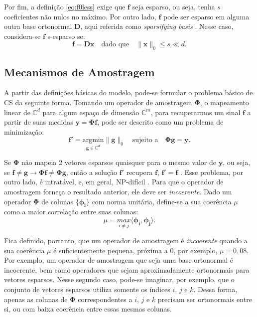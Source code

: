 \documentclass[cic,tc]{iiufrgs}
\renewcommand{\vec}[1]{\bm{#1}}
\newcommand{\mat}[1]{\bm{#1}}
\begin{document}
Por fim, a definição \eqref{eq:f0less} exige que $\vec{f}$ seja esparso, ou seja, tenha $s$ coeficientes não nulos
no máximo. 
Por outro lado, $\vec{f}$ pode ser esparso em alguma outra base ortonormal $\mathbf{D}$, aqui referida como 
\textit{sparsifying basis} \cite{CandesDecoLinear}. Nesse caso, considera-se $\vec{f}$ s-esparso se:
\begin{equation}
    \vec{f} = \mathbf{D}\vec{x} \hspace{1em} \text{dado que} \hspace{1em} \lVert \vec{x} \rVert_0 \le s \ll d.
\end{equation}


\subsection{Mecanismos de Amostragem}
A partir das definições básicas do modelo, pode-se formular o problema básico de CS da seguinte forma.
Tomando um operador de amostragem $\mathbf{\Phi}$, o mapeamento linear de $\mathbb{C}^d$ para algum espaço de dimensão 
$\mathbb{C}^m$, para recuperarmos um sinal $\vec{f}$ a partir de suas medidas $\vec{y} = \mathbf{\Phi} \vec{f}$,
pode ser descrito como um problema de minimização:
\begin{equation}
    \label{eq:problem}
    \vec{f}' = \underset{\vec{g} \in \mathbb{C}^d}{\text{argmin}} \lVert \vec{g} \rVert_0 \hspace{1em} \text{sujeito a} \hspace{1em}
    \mathbf{\Phi} \vec{g} = \vec{y}.
\end{equation}

Se $\mathbf{\Phi}$ não mapeia 2 vetores esparsos quaisquer para o mesmo valor de $\vec{y}$, ou seja,
se $\vec{f} \ne \vec{g} \rightarrow \mathbf{\Phi}\vec{f} \ne \mathbf{\Phi}\vec{g} $, então a solução $\vec{f}'$ recupera
$\vec{f}$, $\vec{f}' = \vec{f}$ \cite{chen2015compressed}. Esse problema, por outro lado, é intratável, e, em geral,
NP-difícil \cite{Mut05}.
Para que o operador de amostragem forneça o resultado anterior, ele deve ser \textit{incoerente}.
Dado um operador $\mathbf{\Phi}$ de colunas $\{ \vec{\phi_i} \}$  com norma unitária, define-se a sua coerência $\mu$
como a maior correlação entre suas colunas:
\begin{equation}
    \label{eq:coerence}
    \mu = \underset{i \ne j}{max}\langle \vec{\phi_i} , \vec{\phi_j} \rangle.
\end{equation}

Fica definido, portanto, que um operador de amostragem é \textit{incoerente} quando a sua coerência $\mu$ é 
suficientemente pequena, próxima a $0$, por exemplo, $\mu=0,08$.
Por exemplo, um operador de amostragem que seja uma base ortonormal é incoerente,
bem como operadores que sejam aproximadamente ortonormais para vetores esparsos.
Nesse segundo caso, pode-se imaginar, por exemplo, que o conjunto de vetores esparsos utiliza 
somente os índices $i$, $j$ e $k$.
Dessa forma, apenas as colunas de $\mat{\Phi}$ correspondentes a $i$, $j$ e $k$ precisam ser 
ortonormais entre si, ou com baixa coerência entre essas mesmas colunas.
\end{document}
